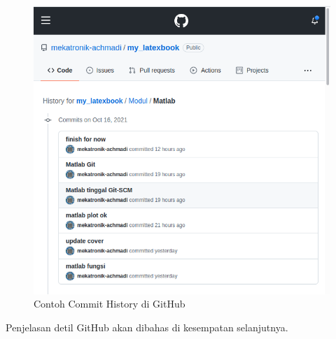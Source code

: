 \documentclass[12pt]{book}
\begin{document}
	\begin{figure}[!ht]
		\centering
		\includegraphics[width=400pt]{images/github0}
		\caption{Contoh Commit History di GitHub}
	\end{figure}

	Penjelasan detil GitHub akan dibahas di kesempatan selanjutnya.
\end{document}
